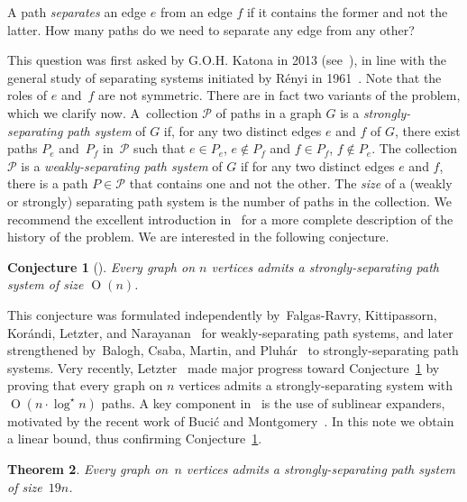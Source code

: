 \documentclass{aic}
\newcommand{\defi}[1]{\emph{#1}}
\DeclareMathOperator{\bigoh}{\mathrm{O}}
\newtheorem{theorem}{Theorem}
\newtheorem{conjecture}[theorem]{Conjecture}
\begin{document}
A path \defi{separates} an edge $e$ from an edge $f$ if it contains the former and not the latter. How many paths do we need to separate any edge from any other?

This question was first asked by G.O.H. Katona in 2013 (see~\cite{falgas2013separating}), in line with the general study of separating systems initiated by R\'enyi in 1961~\cite{renyi1961random}. Note that the roles of $e$ and~$f$ are not symmetric. There are in fact two variants of the problem, which we clarify now. A~collection $\mathcal{P}$ of paths in a graph $G$ is a \defi{strongly-separating path system} of $G$ if, for any two distinct edges $e$ and $f$ of $G$, there exist paths $P_e$ and~$P_f$ in~$\mathcal{P}$ such that $e \in P_e$, $e \not\in P_f$ and $f\in P_f$, $f \not\in P_e$.
The collection $\mathcal{P}$ is a \defi{weakly-separating path system} of $G$ if for any two distinct edges $e$ and $f$, there is a path $P \in \mathcal{P}$ that contains one and not the other.
The \defi{size} of a (weakly or strongly) separating path system is the number of paths in the collection.
We recommend the excellent introduction in~\cite{letzter2022separating} for a more complete description of the history of the problem.
We are interested in the following conjecture.

\begin{conjecture}[\cite{balogh2016path,falgas2013separating}]\label{conj:lin-sep}
Every graph on $n$ vertices admits a strongly-separating path system of size $\bigoh(n)$.
\end{conjecture}



This conjecture was formulated independently by~Falgas-Ravry, Kittipassorn, Kor\'andi, Letzter, and Narayanan~\cite{falgas2013separating} for weakly-separating path systems,
and later strengthened by~Balogh, Csaba, Martin, and Pluh\'ar~\cite{balogh2016path} to strongly-separating path systems.
Very recently, Letzter~\cite{letzter2022separating} made
major progress toward Conjecture~\ref{conj:lin-sep} by proving
that every graph on \(n\) vertices admits a strongly-separating
system with $\bigoh(n\cdot \log^\star n)$ paths. A key component
in~\cite{letzter2022separating} is the use of sublinear
expanders, motivated by the recent work of Buci\'c and
Montgomery~\cite{bucic2022towards}.
 In this note we obtain a linear bound, thus confirming Conjecture~\ref{conj:lin-sep}.

\begin{theorem}\label{thm:main}
  Every graph on~$n$ vertices	admits a strongly-separating path system of size~\(19n\).
\end{theorem}
\end{document}
